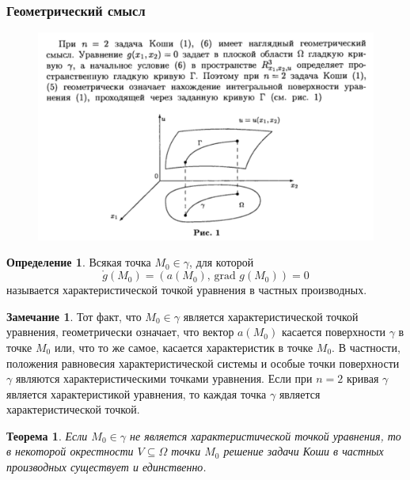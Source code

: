 \documentclass[a4paper,12pt]{article}
\theoremstyle{plain}
\newtheorem{theorem}{Теорема}[section]
\theoremstyle{definition}
\newtheorem{definition}{Определение}[section]
\newtheorem*{note}{Замечание}
\theoremstyle{remark}
\begin{document}
\subsubsection*{Геометрический смысл}
\begin{figure}[h]
	\includegraphics[scale=0.7]{img/geom_mean.png}
\end{figure}

\begin{definition}
	Всякая точка $M_0 \in \gamma$, для которой
	\[\mathring{g}(M_0) = (a(M_0),\,\text{grad }g(M_0)) = 0\]
	называется характеристической точкой уравнения в частных производных.
\end{definition}

\begin{note}
	Тот факт, что $M_0 \in \gamma$ является характеристической точкой уравнения, геометрически означает, что вектор $a(M_0)$ касается поверхности $\gamma$ в точке $M_0$ или, что то же самое, касается характеристик в точке $M_0$. В частности, положения равновесия характеристической системы и особые точки поверхности $\gamma$ являются характеристическими точками уравнения. Если при $n = 2$ кривая $\gamma$ является характеристикой уравнения, то каждая точка $\gamma$ является характеристической точкой.
\end{note}

\begin{theorem}
	Если $M_0 \in \gamma$ не является характеристической точкой уравнения, то в некоторой окрестности $V \subseteq \Omega$ точки $M_0$ решение задачи Коши в частных производных существует и единственно.
\end{theorem}
\end{document}
